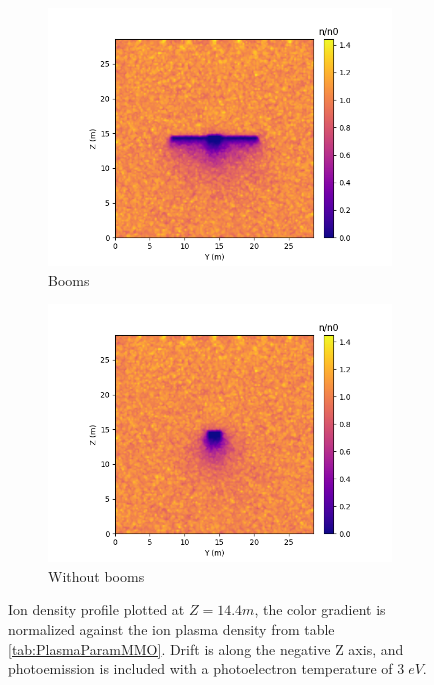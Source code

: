\begin{figure}[H]
  \begin{subfigure}[b]{0.6\textwidth}
  \includegraphics[width=\textwidth]{figures/MMO/PHTemp/WB/I_PHTemp_WB.png}
  \caption{Booms}
  \label{fig:I_PHTemp_WB}
\end{subfigure}
\begin{subfigure}[b]{0.6\textwidth}
  \includegraphics[width=\textwidth]{figures/MMO/PHTemp/NB/I_PHTemp_NB.png}
  \caption{Without booms}
  \label{fig:I_PHTemp_NB}
\end{subfigure}
\caption{Ion density profile plotted at $Z = 14.4 m$, the color gradient is normalized against the ion plasma density from table \ref{tab:PlasmaParamMMO}. Drift is along the negative Z axis, and photoemission is included with a photoelectron temperature of $3 \; eV$.}
\label{fig:Ions_PHTemp}
\end{figure}

